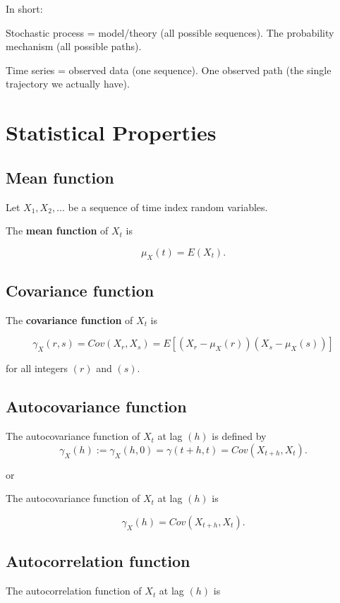 \documentclass[
  11pt,
  a4paper,
]{report}
\begin{document}
In short:

Stochastic process = model/theory (all possible sequences). The
probability mechanism (all possible paths).

Time series = observed data (one sequence). One observed path (the
single trajectory we actually have).

\section{Statistical Properties}\label{statistical-properties}

\subsection{Mean function}\label{mean-function}

Let \({X_1, X_2, ...}\) be a sequence of time index random variables.

The \textbf{mean function} of \({X_t}\) is

\[\mu_X(t)=E(X_t).\]

\subsection{Covariance function}\label{covariance-function}

The \textbf{covariance function} of \({X_t}\) is

\[\gamma_X(r, s)=Cov(X_r, X_s)=E[(X_r-\mu_X(r))(X_s-\mu_X(s))]\]

for all integers \((r)\) and \((s)\).

\subsection{Autocovariance function}\label{autocovariance-function}

The autocovariance function of \({X_t}\) at lag \((h)\) is defined by
\[\gamma_X(h):=\gamma_X(h, 0)=\gamma(t+h, t)=Cov(X_{t+h}, X_t).\]

or

The autocovariance function of \({X_t}\) at lag \((h)\) is

\[\gamma_X(h)=Cov(X_{t+h}, X_t).\]

\subsection{Autocorrelation function}\label{autocorrelation-function}

The autocorrelation function of \({X_t}\) at lag \((h)\) is
\end{document}
